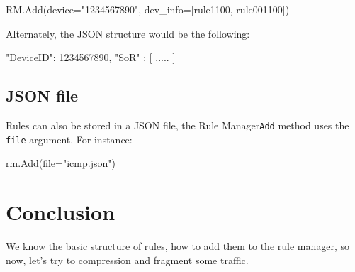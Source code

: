 \begin{termc}[backgroundcolor=\color{palerod}, basicstyle=\ttfamily\small, escapechar=@, language=Python]
RM.Add(device="1234567890", dev_info=[rule1100, rule001100])
\end{termc}

Alternately, the JSON structure would be the following:

\begin{termc}[backgroundcolor=\color{yellow}, basicstyle=\ttfamily\small, escapechar=@]
{
    "DeviceID": 1234567890,
    "SoR" : [ ..... ]
}
\end{termc}

\subsection{JSON file}

Rules can also be stored in a JSON file, the Rule Manager\texttt{Add} method uses the \texttt{file} argument. For instance:

\begin{termc}[backgroundcolor=\color{palerod}, basicstyle=\ttfamily\small, escapechar=@, language=Python]
rm.Add(file="icmp.json")
\end{termc}

\section{Conclusion}

We know the basic structure of rules, how to add them to the rule manager, so now, let's try to compression and fragment some traffic.

